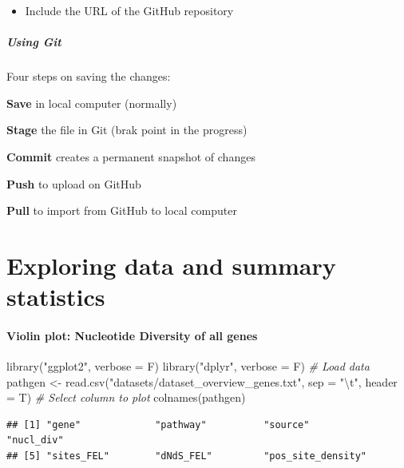 \documentclass[
]{article}
\newenvironment{Shaded}{\begin{snugshade}}{\end{snugshade}}
\newcommand{\AttributeTok}[1]{\textcolor[rgb]{0.77,0.63,0.00}{#1}}
\newcommand{\CommentTok}[1]{\textcolor[rgb]{0.56,0.35,0.01}{\textit{#1}}}
\newcommand{\FunctionTok}[1]{\textcolor[rgb]{0.00,0.00,0.00}{#1}}
\newcommand{\NormalTok}[1]{#1}
\newcommand{\OtherTok}[1]{\textcolor[rgb]{0.56,0.35,0.01}{#1}}
\newcommand{\SpecialCharTok}[1]{\textcolor[rgb]{0.00,0.00,0.00}{#1}}
\newcommand{\StringTok}[1]{\textcolor[rgb]{0.31,0.60,0.02}{#1}}
\providecommand{\tightlist}{%
  \setlength{\itemsep}{0pt}\setlength{\parskip}{0pt}}
\begin{document}
\begin{itemize}
\tightlist
\item
  Include the URL of the GitHub repository
\end{itemize}

\hypertarget{using-git}{%
\subparagraph{Using Git}\label{using-git}}

Four steps on saving the changes:

\textbf{Save} in local computer (normally)

\textbf{Stage} the file in Git (brak point in the progress)

\textbf{Commit} creates a permanent snapshot of changes

\textbf{Push} to upload on GitHub

\textbf{Pull} to import from GitHub to local computer

\hypertarget{exploring-data-and-summary-statistics}{%
\section{Exploring data and summary
statistics}\label{exploring-data-and-summary-statistics}}

\hypertarget{violin-plot-nucleotide-diversity-of-all-genes}{%
\paragraph{\texorpdfstring{\textbf{Violin plot: Nucleotide Diversity of
all
genes}}{Violin plot: Nucleotide Diversity of all genes}}\label{violin-plot-nucleotide-diversity-of-all-genes}}

\begin{Shaded}
\begin{Highlighting}[]
\FunctionTok{library}\NormalTok{(}\StringTok{"ggplot2"}\NormalTok{, }\AttributeTok{verbose =}\NormalTok{ F)}
\FunctionTok{library}\NormalTok{(}\StringTok{"dplyr"}\NormalTok{, }\AttributeTok{verbose =}\NormalTok{ F)}
\CommentTok{\# Load data}
\NormalTok{pathgen }\OtherTok{\textless{}{-}} \FunctionTok{read.csv}\NormalTok{(}\StringTok{"datasets/dataset\_overview\_genes.txt"}\NormalTok{, }\AttributeTok{sep =} \StringTok{"}\SpecialCharTok{\textbackslash{}t}\StringTok{"}\NormalTok{, }\AttributeTok{header =}\NormalTok{ T)}
\CommentTok{\# Select column to plot}
\FunctionTok{colnames}\NormalTok{(pathgen)}
\end{Highlighting}
\end{Shaded}

\begin{verbatim}
## [1] "gene"             "pathway"          "source"           "nucl_div"        
## [5] "sites_FEL"        "dNdS_FEL"         "pos_site_density"
\end{verbatim}
\end{document}
